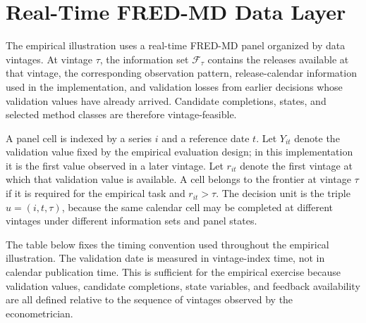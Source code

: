 \documentclass[a4paper,12pt]{article}
\newcommand{\Fcal}{\mathcal{F}}
\newcommand{\1}{\mathbf{1}}
\begin{document}
\section{Real-Time FRED-MD Data Layer}
\label{ia:data_layer}

The empirical illustration uses a real-time FRED-MD panel organized by data vintages. At vintage $\tau$, the information set $\Fcal_\tau$ contains the releases available at that vintage, the corresponding observation pattern, release-calendar information used in the implementation, and validation losses from earlier decisions whose validation values have already arrived. Candidate completions, states, and selected method classes are therefore vintage-feasible.

A panel cell is indexed by a series $i$ and a reference date $t$. Let $Y_{it}$ denote the validation value fixed by the empirical evaluation design; in this implementation it is the first value observed in a later vintage. Let $r_{it}$ denote the first vintage at which that validation value is available. A cell belongs to the frontier at vintage $\tau$ if it is required for the empirical task and $r_{it}>\tau$. The decision unit is the triple $u=(i,t,\tau)$, because the same calendar cell may be completed at different vintages under different information sets and panel states.

The table below fixes the timing convention used throughout the empirical illustration. The validation date is measured in vintage-index time, not in calendar publication time. This is sufficient for the empirical exercise because validation values, candidate completions, state variables, and feedback availability are all defined relative to the sequence of vintages observed by the econometrician.
\end{document}
